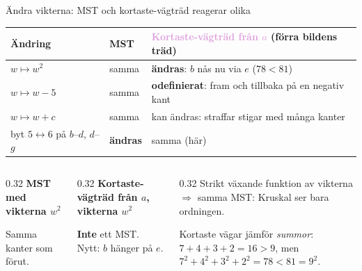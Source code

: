\begin{frame}{Ändra vikterna: MST och kortaste-vägträd reagerar olika}
\scriptsize
\renewcommand{\arraystretch}{1.05}
\begin{tabularx}{\textwidth}{@{}p{}p{}X@{}}
\toprule
\textbf{Ändring} & \textcolor{kthblue}{\textbf{MST}} & \textcolor{plum}{\textbf{Kortaste-vägträd från $a$}} (förra bildens träd)\\
\midrule
$w\mapsto w^2$ & samma & \textbf{ändras}: $b$ nås nu via $e$ ($78<81$)\\
$w\mapsto w-5$ & samma & \textbf{odefinierat}: fram och tillbaka på en negativ kant\\
$w\mapsto w+c$ & samma & kan ändras: straffar stigar med många kanter\\
byt $5\leftrightarrow6$ på $b$--$d$, $d$--$g$ & \textbf{ändras} & samma (här)\\
\bottomrule
\end{tabularx}
\smallskip
\begin{columns}[T]
\begin{column}{0.32\textwidth}
\centering
{\scriptsize\bfseries\color{kthblue}MST med vikterna $w^2$}\par
\par
{\scriptsize\color{kthblue}Samma kanter som förut.}
\end{column}
\begin{column}{0.32\textwidth}
\centering
{\scriptsize\bfseries\color{plum}Kortaste-vägträd från $a$, vikterna $w^2$}\par
\par
{\scriptsize\color{plum}\textbf{Inte} ett MST. Nytt: $b$ hänger på $e$.}
\end{column}
\begin{column}{0.32\textwidth}
\footnotesize
Strikt växande funktion av vikterna $\Rightarrow$ samma MST: Kruskal ser bara ordningen.\par\smallskip
Kortaste vägar jämför \emph{summor}: $7+4+3+2=16>9$, men $7^2+4^2+3^2+2^2=78<81=9^2$.
\end{column}
\end{columns}
\end{frame}

